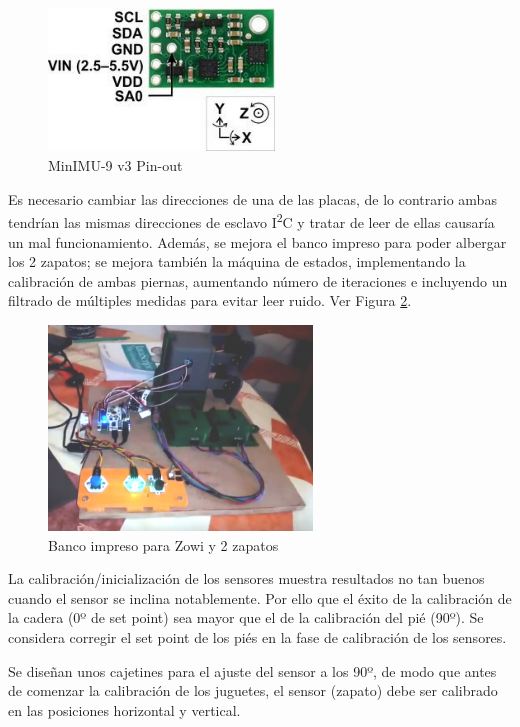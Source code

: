 \begin{figure}[h]
\centering
\includegraphics[width=60mm]{Figures/minimu_sa0}
\caption[MinIMU-9 v3 Pin-out]{MinIMU-9 v3 Pin-out}
\label{fig:minimu_sa0}
\end{figure}

Es necesario cambiar las direcciones de una de las placas, de lo contrario ambas tendrían las mismas direcciones de esclavo I\textsuperscript{2}C y tratar de leer de ellas causaría un mal funcionamiento. Además, se mejora el banco impreso para poder albergar los 2 zapatos; se mejora también la máquina de estados, implementando la calibración de ambas piernas, aumentando número de iteraciones e incluyendo un filtrado de múltiples medidas para evitar leer ruido. Ver Figura \ref{fig:banco_2zapato}.

\begin{figure} [h]
\centering
\includegraphics[width=70mm]{Figures/banco_2zapato}
\caption[Banco 1 zapato]{Banco impreso para Zowi y 2 zapatos}
\label{fig:banco_2zapato}
\end{figure}

La calibración/inicialización de los sensores muestra resultados no tan buenos cuando el sensor se inclina notablemente. Por ello que el éxito de la calibración de la cadera (0º de set point) sea mayor que el de la calibración del pié (90º). Se considera corregir el set point de los piés en la fase de calibración de los sensores.

Se diseñan unos cajetines para el ajuste del sensor a los 90º, de modo que antes de comenzar la calibración de los juguetes, el sensor (zapato) debe ser calibrado en las posiciones horizontal y vertical.

